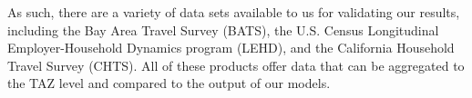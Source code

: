 As such, there are a variety of data sets available to us for validating our results, including the Bay Area Travel Survey (BATS), the U.S. Census Longitudinal Employer-Household Dynamics program (LEHD), and the California Household Travel Survey (CHTS). All of these products offer data that can be aggregated to the TAZ level and compared to the output of our models.